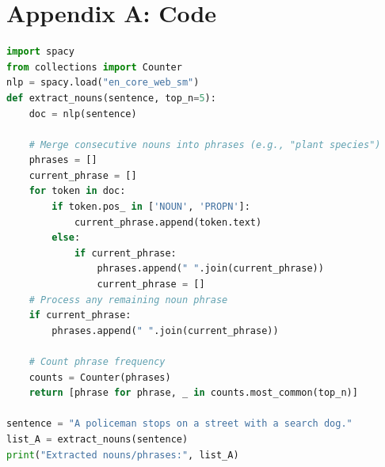 \documentclass[11pt,letterpaper]{article}
\begin{document}
\appendix
\section*{Appendix A: Code}

\begin{lstlisting}[language=Python, caption={Code for Noun extraction}, label={lst:mask_processing}]
import spacy
from collections import Counter
nlp = spacy.load("en_core_web_sm")
def extract_nouns(sentence, top_n=5):
    doc = nlp(sentence)

    # Merge consecutive nouns into phrases (e.g., "plant species")
    phrases = []
    current_phrase = []
    for token in doc:
        if token.pos_ in ['NOUN', 'PROPN']:
            current_phrase.append(token.text)
        else:
            if current_phrase:
                phrases.append(" ".join(current_phrase))
                current_phrase = []
    # Process any remaining noun phrase
    if current_phrase:
        phrases.append(" ".join(current_phrase))

    # Count phrase frequency
    counts = Counter(phrases)
    return [phrase for phrase, _ in counts.most_common(top_n)]

sentence = "A policeman stops on a street with a search dog."
list_A = extract_nouns(sentence)
print("Extracted nouns/phrases:", list_A)
\end{lstlisting}
\end{document}

